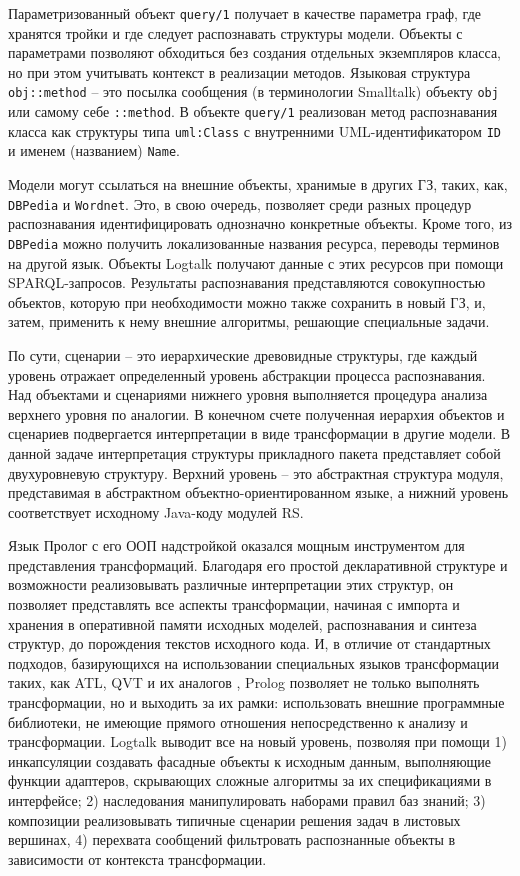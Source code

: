 \documentclass[12pt]{article}
\begin{document}
Параметризованный объект \texttt{query/1} получает в качестве параметра граф, где хранятся тройки и где следует распознавать структуры модели.  Объекты с параметрами позволяют обходиться без создания отдельных экземпляров класса, но при этом учитывать контекст в реализации методов.  Языковая структура \texttt{obj::method} -- это посылка сообщения (в терминологии Smalltalk) объекту \texttt{obj} или самому себе \texttt{::method}.  В объекте \texttt{query/1} реализован метод распознавания класса как структуры типа \texttt{uml:Class} с внутренними UML-идентификатором \texttt{ID} и именем (названием) \texttt{Name}.

Модели могут ссылаться на внешние объекты, хранимые в других ГЗ, таких, как, \texttt{DBPedia} и \texttt{Wordnet}.  Это, в свою очередь, позволяет среди разных процедур распознавания идентифицировать однозначно конкретные объекты.  Кроме того, из \texttt{DBPedia} можно получить локализованные названия ресурса, переводы терминов на другой язык.  Объекты Logtalk получают данные с этих ресурсов при помощи SPARQL-запросов.  Результаты распознавания представляются совокупностью объектов, которую при необходимости можно также сохранить в новый ГЗ, и, затем, применить к нему внешние алгоритмы, решающие специальные задачи.

По сути, сценарии -- это иерархические древовидные структуры, где каждый уровень отражает определенный уровень абстракции процесса распознавания.  Над объектами и сценариями нижнего уровня выполняется процедура анализа верхнего уровня по аналогии.  В конечном счете полученная иерархия объектов и сценариев подвергается интерпретации в виде трансформации в другие модели.  В данной задаче интерпретация структуры прикладного пакета представляет собой двухуровневую структуру. Верхний уровень -- это абстрактная структура модуля, представимая в абстрактном объектно-ориентированном языке, а нижний уровень соответствует исходному Java-коду модулей RS.

Язык Пролог с его ООП надстройкой оказался мощным инструментом для представления трансформаций.  Благодаря его простой декларативной структуре и возможности реализовывать различные интерпретации этих структур, он позволяет представлять все аспекты трансформации, начиная с импорта и хранения в оперативной памяти исходных моделей, распознавания и синтеза структур, до порождения текстов исходного кода.  И, в отличие от стандартных подходов, базирующихся на использовании специальных языков трансформации таких, как ATL, QVT и их аналогов \cite{azis,QVT,nikita}, Prolog позволяет не только выполнять трансформации, но и выходить за их рамки: использовать внешние программные библиотеки, не имеющие прямого отношения непосредственно к анализу и трансформации.  Logtalk выводит все на новый уровень, позволяя при помощи 1) инкапсуляции создавать фасадные объекты к исходным данным, выполняющие функции адаптеров, скрывающих сложные алгоритмы за их спецификациями в интерфейсе; 2) наследования манипулировать наборами правил баз знаний; 3) композиции реализовывать типичные сценарии решения задач в листовых вершинах, 4) перехвата сообщений фильтровать распознанные объекты в зависимости от контекста трансформации.
\end{document}

